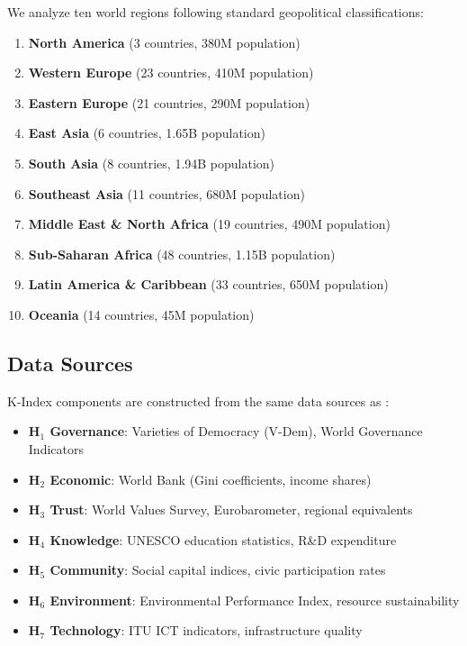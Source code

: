 \documentclass[12pt,a4paper]{article}
\begin{document}
We analyze ten world regions following standard geopolitical classifications:

\begin{enumerate}
    \item \textbf{North America} (3 countries, 380M population)
    \item \textbf{Western Europe} (23 countries, 410M population)
    \item \textbf{Eastern Europe} (21 countries, 290M population)
    \item \textbf{East Asia} (6 countries, 1.65B population)
    \item \textbf{South Asia} (8 countries, 1.94B population)
    \item \textbf{Southeast Asia} (11 countries, 680M population)
    \item \textbf{Middle East \& North Africa} (19 countries, 490M population)
    \item \textbf{Sub-Saharan Africa} (48 countries, 1.15B population)
    \item \textbf{Latin America \& Caribbean} (33 countries, 650M population)
    \item \textbf{Oceania} (14 countries, 45M population)
\end{enumerate}

\subsection{Data Sources}

K-Index components are constructed from the same data sources as \citet{Paper1}:

\begin{itemize}
    \item \textbf{H$_1$ Governance}: Varieties of Democracy (V-Dem), World Governance Indicators
    \item \textbf{H$_2$ Economic}: World Bank (Gini coefficients, income shares)
    \item \textbf{H$_3$ Trust}: World Values Survey, Eurobarometer, regional equivalents
    \item \textbf{H$_4$ Knowledge}: UNESCO education statistics, R\&D expenditure
    \item \textbf{H$_5$ Community}: Social capital indices, civic participation rates
    \item \textbf{H$_6$ Environment}: Environmental Performance Index, resource sustainability
    \item \textbf{H$_7$ Technology}: ITU ICT indicators, infrastructure quality
\end{itemize}
\end{document}
